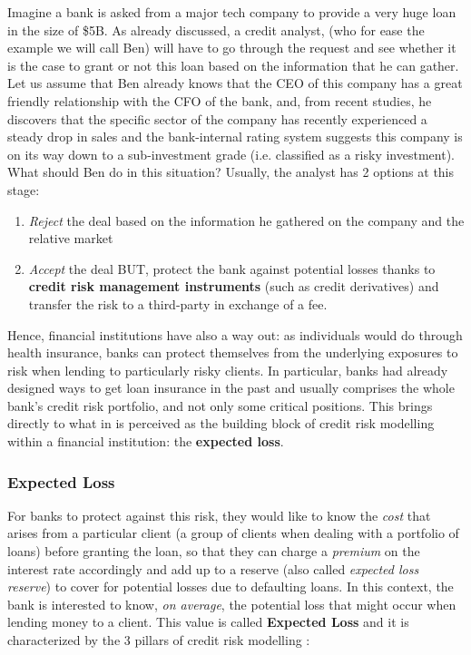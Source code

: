 \documentclass[a4paper,12pt]{article}
\begin{document}
    \begin{example}

        Imagine a bank is asked from a major tech company to provide a very huge loan in the size of \$5B. 
        As already discussed, a credit analyst, (who for ease the example we will call Ben) will have to 
        go through the request and see whether it is the case to grant or not this loan based on the 
        information that he can gather. Let us assume that Ben already knows that the CEO of this company 
        has a great friendly relationship with the CFO of the bank, and, from recent studies, 
        he discovers that the specific sector of the company has recently experienced
        a steady drop in sales and the bank-internal rating system suggests this company 
        is on its way down to a sub-investment grade (i.e. classified as a risky investment). 
        What should Ben do in this situation? Usually, the analyst has 2 options at this stage:

        \begin{enumerate}
                    \item \textit{Reject} the deal based on the information he gathered on the company and the relative market
                    \item \textit{Accept} the deal BUT, protect the bank against potential losses thanks to \textbf{credit risk management instruments} (such as credit derivatives) and transfer the risk to a third-party in exchange of a fee. \cite{investopediacreditderivative}
        \end{enumerate}

    \end{example}

    Hence, financial institutions have also a way out: as individuals would do through health insurance, 
    banks can protect themselves from the underlying exposures to risk when lending to particularly risky clients. 
    In particular, banks had already designed ways to get loan insurance in the past and usually comprises 
    the whole bank's credit risk portfolio, and not only some critical positions. 
    This brings directly to what in \cite{bluhm2016introduction} is perceived as the building block of 
    credit risk modelling within a financial institution: the \textbf{expected loss}.

    \subsubsection{Expected Loss}
    For banks to protect against this risk, they would like to know the \textit{cost} 
    that arises from a particular client (a group of clients when dealing with a portfolio of loans) 
    before granting the loan, so that they can charge a \textit{premium} on the interest rate accordingly 
    and add up to a reserve (also called \textit{expected loss reserve}) to cover for potential losses 
    due to defaulting loans.
    In this context, the bank is interested to know, \textit{on average}, 
    the potential loss that might occur when lending money to a client.
    This value is called \textbf{Expected Loss} and it is characterized 
    by the 3 pillars of credit risk modelling \cite{bankofenglandcreditrisk}:
\end{document}
